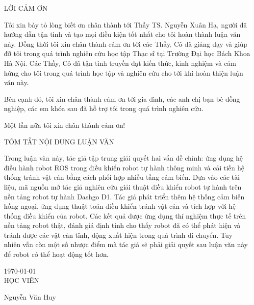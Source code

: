 \newpage
\begin{center}
    LỜI CẢM ƠN
\end{center}

Tôi xin bày tỏ lòng biết ơn chân thành tới Thầy TS. Nguyễn Xuân Hạ, người đã hướng dẫn tận tình và tạo mọi điều kiện tốt nhất cho tôi hoàn thành luận văn này. Đồng thời tôi xin chân thành cảm ơn tới các Thầy, Cô đã giảng dạy và giúp đỡ tôi trong quá trình nghiên cứu học tập Thạc sĩ tại Trường Đại học Bách Khoa Hà Nội. Các Thầy, Cô đã tận tình truyền đạt kiến thức, kinh nghiệm và cảm hứng cho tôi trong quá trình học tập và nghiên cứu cho tới khi hoàn thiện luận văn này.

Bên cạnh đó, tôi xin chân thành cảm ơn tới gia đình, các anh chị bạn bè đồng nghiệp, các em khóa sau đã hỗ trợ tôi trong quá trình nghiên cứu.

Một lần nữa tôi xin chân thành cảm ơn!

\hspace{2cm}

\begin{center}
    TÓM TẮT NỘI DUNG LUẬN VĂN
\end{center}

Trong luận văn này, tác giả tập trung giải quyết hai vấn đề chính: ứng dụng hệ điều hành robot ROS trong điều khiển robot tự hành thông minh và cải tiến hệ thống tránh vật cản bằng cách phối hợp nhiều tầng cảm biến. Dựa vào các tài liệu, mã nguồn mở tác giả nghiên cứu giải thuật điều khiển robot tự hành trên nền tảng robot tự hành Dashgo D1.
Tác giả phát triển thêm hệ thống cảm biến hồng ngoại, ứng dụng thuật toán điều khiển tránh vật cản và tích hợp với hệ thống điều khiển của robot.
Các kết quả được ứng dụng thí nghiệm thực tế trên nền tảng robot thật, đánh giá định tính cho thấy robot đã có thể phát hiện và tránh được các vật cản tĩnh, động xuất hiện trong quá trình di chuyển. Tuy nhiên vẫn còn một số nhược điểm mà tác giả sẽ phải giải quyết sau luận văn này để robot có thể hoạt động tốt hơn.


\hspace{5cm}

\hspace{7cm} \today \\

\hspace{8cm} HỌC VIÊN \\

\hspace{30pt}

\hspace{7.5cm} Nguyễn Văn Huy
